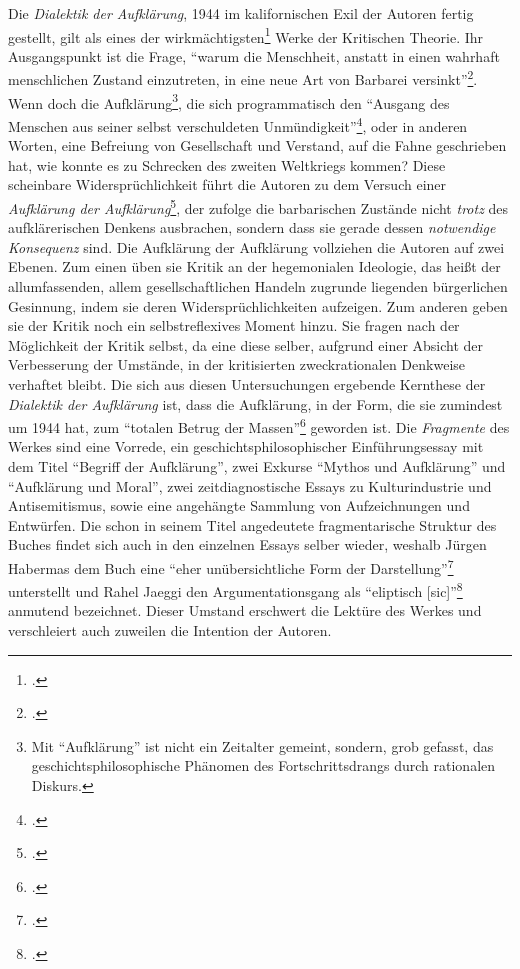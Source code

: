 \documentclass[a4paper, 12pt]{article}
\begin{document}
\begin{onehalfspace}
\noindent Die \emph{Dialektik der Aufklärung}, 1944 im kalifornischen Exil der Autoren fertig gestellt, gilt als eines der wirkmächtigsten\footnote{\Cite[Vgl.][S. 249]{jaeggi}.} Werke der Kritischen Theorie. Ihr Ausgangspunkt ist die Frage, "`warum die Menschheit, anstatt in einen wahrhaft menschlichen Zustand einzutreten, in eine neue Art von Barbarei versinkt"'\footnote{\Cite[Siehe][S. 1]{dialektik-der-aufklaerung}.}. Wenn doch die Aufklärung\footnote{Mit "`Aufklärung"' ist nicht ein Zeitalter gemeint, sondern, grob gefasst, das geschichtsphilosophische Phänomen des Fortschrittsdrangs durch rationalen Diskurs.}, die sich programmatisch den "`Ausgang des Menschen aus seiner selbst verschuldeten Unmündigkeit"'\footnote{\Cite[Siehe][S. 481]{kant}.}, oder in anderen Worten, eine Befreiung von Gesellschaft und Verstand, auf die Fahne geschrieben hat, wie konnte es zu Schrecken des zweiten Weltkriegs kommen? Diese scheinbare Widersprüchlichkeit führt die Autoren zu dem Versuch einer \emph{Aufklärung der Aufklärung}\footnote{\Cite[Vgl.][S. 406]{habermas}.}, der zufolge die barbarischen Zustände nicht \emph{trotz} des aufklärerischen Denkens ausbrachen, sondern dass sie gerade dessen \emph{notwendige Konsequenz} sind. Die Aufklärung der Aufklärung vollziehen die Autoren auf zwei Ebenen. Zum einen üben sie Kritik an der hegemonialen Ideologie, das heißt der allumfassenden, allem gesellschaftlichen Handeln zugrunde liegenden bürgerlichen Gesinnung, indem sie deren Widersprüchlichkeiten aufzeigen. Zum anderen geben sie der Kritik noch ein selbstreflexives Moment hinzu. Sie fragen nach der Möglichkeit der Kritik selbst, da eine diese selber, aufgrund einer Absicht der Verbesserung der Umstände, in der kritisierten zweckrationalen Denkweise verhaftet bleibt. Die sich aus diesen Untersuchungen ergebende Kernthese der \emph{Dialektik der Aufklärung} ist, dass die Aufklärung, in der Form, die sie zumindest um 1944 hat, zum "`totalen Betrug der Massen"'\footnote{\Cite[Siehe][S. 49]{dialektik-der-aufklaerung}.} geworden ist. Die \emph{Fragmente} des Werkes sind eine Vorrede, ein geschichtsphilosophischer Einführungsessay mit dem Titel "`Begriff der Aufklärung"', zwei Exkurse "`Mythos und Aufklärung"' und "`Aufklärung und Moral"', zwei zeitdiagnostische Essays zu Kulturindustrie und Antisemitismus, sowie eine angehängte Sammlung von Aufzeichnungen und Entwürfen. Die schon in seinem Titel angedeutete fragmentarische Struktur des Buches findet sich auch in den einzelnen Essays selber wieder, weshalb Jürgen Habermas dem Buch eine "`eher unübersichtliche Form der Darstellung"'\footnote{\Cite[Siehe][S. 406]{habermas}.} unterstellt und Rahel Jaeggi den Argumentationsgang als "`eliptisch [sic]"'\footnote{\Cite[Siehe][S. 250]{jaeggi}.} anmutend bezeichnet. Dieser Umstand erschwert die Lektüre des Werkes und verschleiert auch zuweilen die Intention der Autoren.


\end{onehalfspace}
\end{document}
